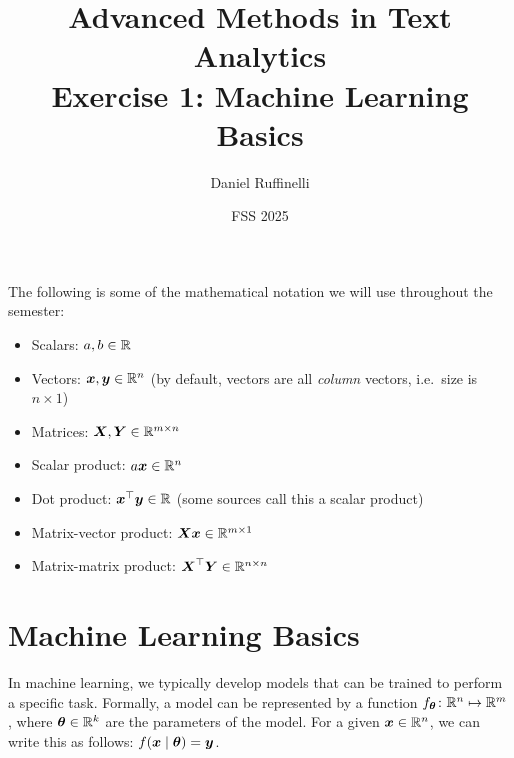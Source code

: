 \documentclass[11pt,a4paper]{article}
\title{Advanced Methods in Text Analytics \\ 
Exercise 1: Machine Learning Basics}
\author{Daniel Ruffinelli}
\date{FSS 2025}
\begin{document}
\maketitle

The following is some of the mathematical notation we will use throughout the
semester:

\begin{itemize}
    \item Scalars: $a,b\in\mathbb{R}$
    \item Vectors: ${\boldsymbol{x}},{\boldsymbol{y}}\in\mathbb{R}^n$ (by default, vectors are all \emph{column}
          vectors, i.e.\ size is $n\times 1$)
    \item Matrices: ${\boldsymbol{X}},{\boldsymbol{Y}}\in\mathbb{R}^{m\times n}$
    \item Scalar product: $a{\boldsymbol{x}}\in\mathbb{R}^n$
    \item Dot product: ${\boldsymbol{x}}^\top{\boldsymbol{y}}\in\mathbb{R}$ (some sources call this a scalar product)
    \item Matrix-vector product: ${\boldsymbol{X}}{\boldsymbol{x}}\in\mathbb{R}^{m\times 1}$
    \item Matrix-matrix product: ${\boldsymbol{X}}^\top{\boldsymbol{Y}}\in\mathbb{R}^{n\times n}$
\end{itemize}

\section{Machine Learning Basics}

In machine learning, we typically develop models that can be trained to perform
a specific task.
Formally, a model can be represented by a function
$f_{{\boldsymbol{\theta}}}\colon \mathbb{R}^n\mapsto \mathbb{R}^m$, where ${\boldsymbol{\theta}}\in\mathbb{R}^k$ are the
parameters of the model.
For a given ${\boldsymbol{x}}\in\mathbb{R}^n$, we can write this as follows:
$f({\boldsymbol{x}}\mid{\boldsymbol{\theta}}) = {\boldsymbol{y}}$.
\end{document}
